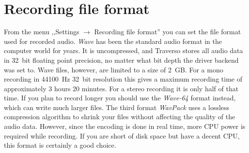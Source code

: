\section{Recording file format}
From the menu ,,Settings $\rightarrow$ Recording file format'' you can set the file format used for recorded audio. \emph{Wave} has been the standard audio format in the computer world for years. It is uncompressed, and Traverso stores all audio data in 32~bit floating point precision, no matter what bit depth the driver backend was set to. Wave files, however, are limited to a size of 2~GB. For a mono recording in 44100~Hz 32~bit resolution this gives a maximum recording time of approximately 3 hours 20 minutes. For a stereo recording it is only half of that time. If you plan to record longer you should use the \emph{Wave-64} format instead, which can write much larger files. The third format \emph{WavPack} uses a lossless compression algorithm to shrink your files without affecting the quality of the audio data. However, since the encoding is done in real time, more CPU power is required while recording. If you are short of disk space but have a decent CPU, this format is certainly a good choice.
